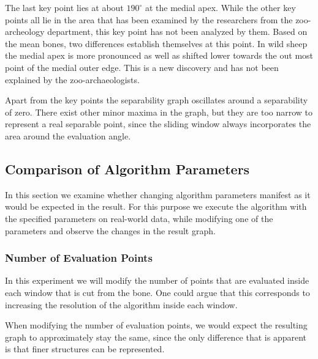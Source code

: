 \documentclass[pdftex,12pt,a4paper]{report}
\begin{document}
The last key point lies at about $190^\circ$ at the medial apex. While the other key points all lie in the area that has been examined by the researchers from the zoo-archeology department, this key point has not been analyzed by them. Based on the mean bones, two differences establish themselves at this point. In wild sheep the medial apex is more pronounced as well as shifted lower towards the out most point of the medial outer edge. This is a new discovery and has not been explained by the zoo-archaeologists.

Apart from the key points the separability graph oscillates around a separability of zero. There exist other minor maxima in the graph, but they are too narrow to represent a real separable point, since the sliding window always incorporates the area around the evaluation angle.



\subsection{Comparison of Algorithm Parameters}
\label{sub:comparisonalgorithmparameters}

In this section we examine whether changing algorithm parameters manifest as it would be expected in the result. For this purpose we execute the algorithm with the specified parameters on real-world data, while modifying one of the parameters and observe the changes in the result graph.

\subsubsection{Number of Evaluation Points}

In this experiment we will modify the number of points that are evaluated inside each window that is cut from the bone. One could argue that this corresponds to increasing the resolution of the algorithm inside each window.

When modifying the number of evaluation points, we would expect the resulting graph to approximately stay the same, since the only difference that is apparent is that finer structures can be represented.
\end{document}
